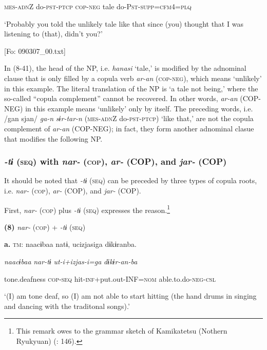     \textsc{mes}-\textsc{adn}Z  do-\textsc{pst}-\textsc{ptcp}  \textsc{cop}-\textsc{neg}  tale  do-P\textsc{st}-\textsc{supp}=\textsc{cfm}4=\textsc{plq}

    ‘Probably you told the unlikely tale like that since (you) thought that I was listening to (that), didn’t you?’

    [Fo: 090307\_00.txt]

In (8-41), the head of the NP, i.e. \textit{hanasi} ‘tale,’ is modified by the adnominal clause that is only filled by a copula verb \textit{ar-an} (\textsc{cop}-\textsc{neg}), which means ‘unlikely’ in this example. The literal translation of the NP is ‘a tale not being,’ where the so-called “copula complement” cannot be recovered. In other words, \textit{ar-an} (COP-NEG) in this example means ‘unlikely’ only by itself. The preceding words, i.e. /gan sjan/ \textit{ga-n} \textit{sɨr-tar-n} (\textsc{mes}-\textsc{adn}Z do-\textsc{pst}-\textsc{ptcp}) ‘like that,’ are not the copula complement of \textit{ar-an} (COP-NEG); in fact, they form another adnominal clasue that modifies the following NP.

\subsubsection{\textit{{}-tɨ} (\textsc{seq}) with \textit{nar-} (\textsc{cop}), \textit{ar-} (COP), and \textit{jar-} (COP)}

It should be noted that \textit{{}-tɨ} (\textsc{seq}) can be preceded by three types of copula roots, i.e. \textit{nar-} (\textsc{cop}), \textit{ar-} (COP), and \textit{jar-} (COP).

First, \textit{nar-} (\textsc{cop}) plus \textit{{}-tɨ} (\textsc{seq}) expresses the reason.\footnote{This remark owes to the grammar sketch of Kamikatetsu (Nothern Ryukyuan) (\citealt{ShirataEtAl2011}: 146).}

\textbf{(8)}  \textit{nar-} (\textsc{cop}) + \textit{{}-tɨ} (\textsc{seq})

  \textbf{a.}  \textsc{tm}:  naacɨbaa  natɨ,  ucizjasiga  dɨkɨranba.

      \textit{naacɨbaa}  \textit{nar-tɨ}  \textit{ut-i+izjas-i=ga}  \textit{dɨkɨr-an-ba}

      tone.deafness  \textsc{cop}-\textsc{seq}  hit-\textsc{inf}+put.out-INF=\textsc{nom}  able.to.do-\textsc{neg}-\textsc{csl}

      ‘(I) am tone deaf, so (I) am not able to start hitting (the hand drums in singing and dancing with the traditonal songs).’

